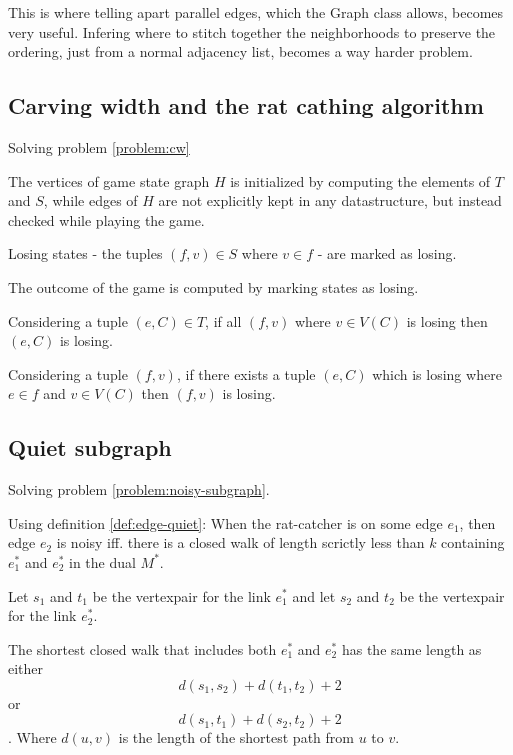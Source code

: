 \documentclass{article}
\begin{document}
		This is where telling apart parallel edges, which the Graph class allows, becomes very useful. Infering where to stitch together the neighborhoods to preserve the ordering, just from a normal adjacency list, becomes a way harder problem.


	\subsection{Carving width and the rat cathing algorithm}\label{impl:cw}

		Solving problem \ref{problem:cw}

		The vertices of game state graph $H$ is initialized by computing the elements of $T$ and $S$, while edges of $H$ are not explicitly kept in any datastructure, but instead checked while playing the game.

		Losing states - the tuples $(f,v) \in S$ where $v \in f$ - are marked as losing.

		The outcome of the game is computed by marking states as losing.
		
		Considering a tuple $(e, C) \in T$, if all $(f, v)$ where $v \in V(C)$ is losing then $(e, C)$ is losing.

		Considering a tuple $(f, v)$, if there exists a tuple $(e, C)$ which is losing where $e \in f$ and $v \in V(C)$ then $(f, v)$ is losing.


	\subsection{Quiet subgraph}\label{impl:quiet}

		Solving problem \ref{problem:noisy-subgraph}.

		Using definition \ref{def:edge-quiet}: When the rat-catcher is on some edge $e_1$, then edge $e_2$ is noisy iff. there is a closed walk of length scrictly less than $k$ containing $e_1^*$ and $e_2^*$ in the dual $M^*$.

		Let $s_1$ and $t_1$ be the vertexpair for the link $e_1^*$ and let $s_2$ and $t_2$ be the vertexpair for the link $e_2^*$.

		\begin{claim}
			The shortest closed walk that includes both $e_1^*$ and $e_2^*$ has the same length as either $$d(s_1, s_2) + d(t_1, t_2) + 2$$ or $$d(s_1, t_1) + d(s_2, t_2) + 2$$. Where $d(u, v)$ is the length of the shortest path from $u$ to $v$.
		\end{claim}
\end{document}
